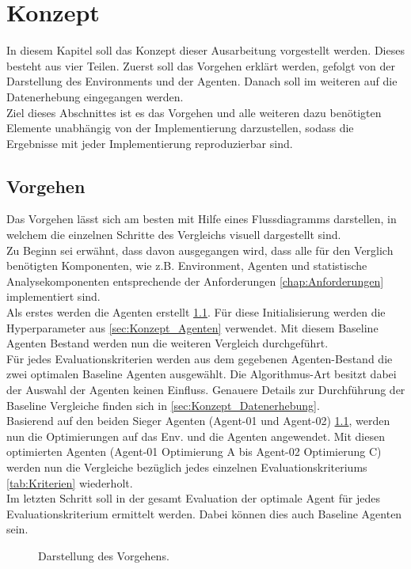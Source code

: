 \chapter{Konzept} \label{chap:Konzept}
In diesem Kapitel soll das Konzept dieser Ausarbeitung vorgestellt werden. Dieses besteht aus vier Teilen. Zuerst soll das Vorgehen erklärt werden, gefolgt von der Darstellung des Environments und der Agenten. Danach soll im weiteren auf die Datenerhebung eingegangen werden.\\
Ziel dieses Abschnittes ist es das Vorgehen und alle weiteren dazu benötigten Elemente unabhängig von der Implementierung darzustellen, sodass die Ergebnisse mit jeder Implementierung reproduzierbar sind.

\section{Vorgehen} \label{sec:Konzept_Vorgehen}
Das Vorgehen lässt sich am besten mit Hilfe eines Flussdiagramms darstellen, in welchem die einzelnen Schritte des Vergleichs visuell dargestellt sind.\\
Zu Beginn sei erwähnt, dass davon ausgegangen wird, dass alle für den Verglich benötigten Komponenten, wie z.B. Environment, Agenten und statistische Analysekomponenten entsprechende der Anforderungen \ref{chap:Anforderungen} implementiert sind.\\
Als erstes werden die Agenten erstellt \ref{fig:Vorgehen}. Für diese Initialisierung werden die Hyperparameter aus \ref{sec:Konzept_Agenten} verwendet.
Mit diesem Baseline Agenten Bestand werden nun die weiteren Vergleich durchgeführt.\\
Für jedes Evaluationskriterien werden aus dem gegebenen Agenten-Bestand die zwei optimalen Baseline Agenten ausgewählt. Die Algorithmus-Art besitzt dabei der Auswahl der Agenten keinen Einfluss. Genauere Details zur Durchführung der Baseline Vergleiche finden sich in \ref{sec:Konzept_Datenerhebung}.\\
Basierend auf den beiden Sieger Agenten (Agent-01 und Agent-02) \ref{fig:Vorgehen}, werden nun die Optimierungen auf das Env. und die Agenten angewendet. Mit diesen optimierten Agenten (Agent-01 Optimierung A bis Agent-02 Optimierung C) werden nun die Vergleiche bezüglich jedes einzelnen Evaluationskriteriums \ref{tab:Kriterien} wiederholt.\\
Im letzten Schritt soll in der gesamt Evaluation der optimale Agent für jedes Evaluationskriterium ermittelt werden. Dabei können dies auch Baseline Agenten sein.
\begin{figure}[H]
	\centering
	\def\svgscale{0.095}
	
	\caption[Flussdiagramm des Vorgehens]{Darstellung des Vorgehens.}
	\label{fig:Vorgehen}
\end{figure}

